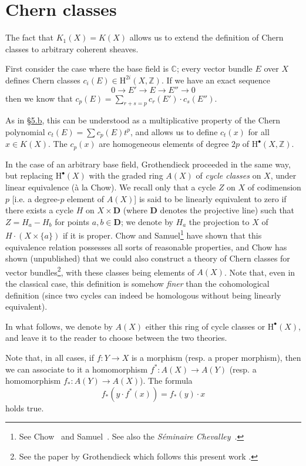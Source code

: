 \documentclass{article}
\newcommand{\HH}{\mathrm{H}}
\newcommand{\oldpage}[1]{\marginpar{\footnotesize$\Big\vert$ \textit{p.~#1}}}
\begin{document}
\section{Chern classes}
\label{section6}

The fact that $K_1(X)=K(X)$ allows us to extend the definition of Chern classes to arbitrary coherent sheaves.

First consider the case where the base field is $\mathbb{C}$;
every vector bundle $E$ over $X$ defines Chern classes $c_i(E)\in\HH^{2i}(X,\mathbb{Z})$.
If we have an exact sequence
\[
  0\to E'\to E\to E''\to0
\]
then we know that $c_p(E)=\sum_{r+s=p}c_r(E')\cdot c_s(E'')$.

As in \hyperref[subsection5b]{\S5.b}, this can be understood as a multiplicative property of the Chern polynomial $c_t(E)=\sum c_p(E)t^p$, and allows us to define $c_t(x)$ for all $x\in K(X)$.
The $c_p(x)$ are homogeneous elements of degree $2p$ of $\HH^\bullet(X,\mathbb{Z})$.

In the case of an arbitrary base field, Grothendieck proceeded in the same way, but replacing $\HH^\bullet(X)$ with the graded ring $A(X)$ of \emph{cycle classes} on $X$, under linear equivalence (\`{a} la Chow).
We recall only that a cycle $Z$ on $X$ of codimension $p$ [i.e. a degree-$p$ element of $A(X)$] is said to be linearly equivalent to zero if there exists a cycle $H$ on $X\times\mathbf{D}$ (where $\mathbf{D}$ denotes the projective line) such that $Z=H_a-H_b$ for points $a,b\in\mathbf{D}$;
we denote by $H_a$ the projection to $X$ of $H\cdot(X\times\{a\})$ if it is proper.
Chow and Samuel\footnote{See Chow~\cite{5} and Samuel~\cite{10}. See also the \emph{S\'{e}minaire Chevalley}~\cite{11}.} have shown that
\oldpage{112}
this equivalence relation possesses all sorts of reasonable properties, and Chow has shown (unpublished) that we could also construct a theory of Chern classes for vector bundles\footnote{See the paper by Grothendieck which follows this present work \cite{8}.}, with these classes being elements of $A(X)$.
Note that, even in the classical case, this definition is somehow \emph{finer} than the cohomological definition (since two cycles can indeed be homologous without being linearly equivalent).

In what follows, we denote by $A(X)$ either this ring of cycle classes or $\HH^\bullet(X)$, and leave it to the reader to choose between the two theories.

Note that, in all cases, if $f\colon Y\to X$ is a morphism (resp. a proper morphism), then we can associate to it a homomorphism $f^*\colon A(X)\to A(Y)$ (resp. a homomorphism $f_*\colon A(Y)\to A(X)$).
The formula
\[
  f_*(y\cdot f^*(x)) = f_*(y)\cdot x
\]
holds true.
\end{document}

